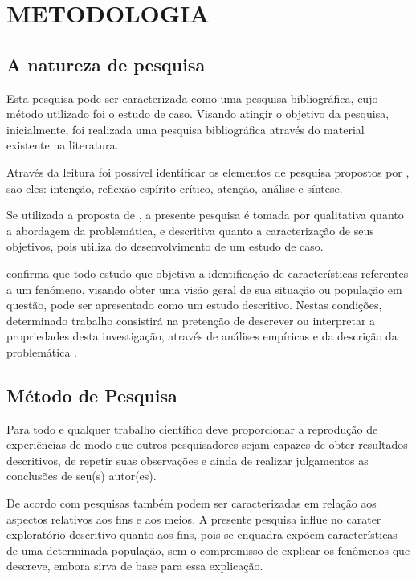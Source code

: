 \chapter{METODOLOGIA}
\thispagestyle{empty}

\section{A natureza de pesquisa}

Esta pesquisa pode ser caracterizada como uma pesquisa bibliográfica, cujo método utilizado foi o estudo de caso. Visando atingir o objetivo da pesquisa, inicialmente, foi realizada uma pesquisa bibliográfica através do material existente na literatura.

Através da leitura foi possivel identificar os elementos de pesquisa propostos por , são eles: intenção, reflexão espírito crítico, atenção, análise e síntese.

Se utilizada a proposta de , a presente pesquisa é tomada por qualitativa quanto a abordagem da problemática, e descritiva quanto a caracterização de seus objetivos, pois utiliza do desenvolvimento de um estudo de caso.

 confirma que todo estudo que objetiva a identificação de características referentes a um fenómeno, visando obter uma visão geral de sua situação ou população em questão, pode ser apresentado como um estudo descritivo. Nestas condições, determinado trabalho consistirá na pretenção de descrever ou interpretar a propriedades desta investigação, através de análises empíricas e da descrição da problemática \cite{fortin2009fundamentos, lakatos2010fundamentos}.

\section{Método de Pesquisa}

Para  todo e qualquer trabalho científico deve proporcionar a reprodução de experiências de modo que outros pesquisadores sejam capazes de obter resultados descritivos, de repetir suas observações e ainda de realizar julgamentos as conclusões de seu(s) autor(es).

De acordo com  pesquisas também podem ser caracterizadas em relação aos aspectos relativos aos fins e aos meios. A presente pesquisa influe no carater exploratório descritivo quanto aos fins, pois se enquadra expõem características de uma determinada população, sem o compromisso de explicar os fenômenos que descreve, embora sirva de base para essa explicação.


